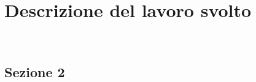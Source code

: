 \chapter{Descrizione del lavoro svolto}
\label{cap:descrizione-lavoro-svolto}

\\

\section{Sezione 2}
